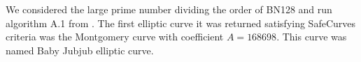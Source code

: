 \documentclass{article}
\begin{document}
\begin{spacing}{1.2}
	We considered the large prime number dividing the order of BN128 and run algorithm A.1 from \cite{generation-baby}. The first elliptic curve it was returned  satisfying SafeCurves criteria was the Montgomery curve with coefficient $A = 168698$. This curve was named Baby Jubjub elliptic curve.  
%	
%	
%	

\end{spacing}
\end{document}
